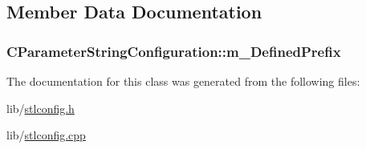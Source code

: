 \subsection{Member Data Documentation}
\hypertarget{classCParameterStringConfiguration_a2607f49a41ee92bcb0629db471a111c0}{
\subsubsection[{m\-\_\-\-Defined\-Prefix}]{ C\-Parameter\-String\-Configuration\-::m\-\_\-\-Defined\-Prefix\hspace{0.3cm}{\ttfamily [protected]}}}\label{classCParameterStringConfiguration_a2607f49a41ee92bcb0629db471a111c0}


The documentation for this class was generated from the following files\-:\begin{DoxyCompactItemize}
\item 
lib/\hyperlink{stlconfig_8h}{stlconfig.\-h}\item 
lib/\hyperlink{stlconfig_8cpp}{stlconfig.\-cpp}\end{DoxyCompactItemize}
